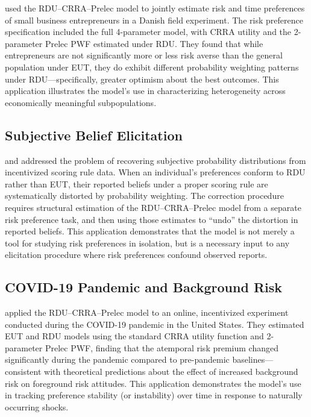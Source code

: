 \documentclass[12pt,a4paper]{article}
\begin{document}
\textcite{Andersen2014} used the RDU--CRRA--Prelec model to jointly estimate
risk and time preferences of small business entrepreneurs in a Danish field
experiment. The risk preference specification included the full 4-parameter
model, with CRRA utility and the 2-parameter Prelec PWF estimated under RDU.
They found that while entrepreneurs are not significantly more or less risk
averse than the general population under EUT, they do exhibit different
probability weighting patterns under RDU---specifically, greater optimism about
the best outcomes. This application illustrates the model's use in
characterizing heterogeneity across economically meaningful subpopulations.

\subsection{Subjective Belief Elicitation}

\textcite{Harrison2017} and \textcite{Harrison2022a} addressed the problem of
recovering subjective probability distributions from incentivized scoring rule
data. When an individual's preferences conform to RDU rather than EUT, their
reported beliefs under a proper scoring rule are systematically distorted by
probability weighting. The correction procedure requires structural estimation
of the RDU--CRRA--Prelec model from a separate risk preference task, and then
using those estimates to ``undo'' the distortion in reported beliefs. This
application demonstrates that the model is not merely a tool for studying risk
preferences in isolation, but is a necessary input to any elicitation procedure
where risk preferences confound observed reports.

\subsection{COVID-19 Pandemic and Background Risk}

\textcite{Harrison2022b} applied the RDU--CRRA--Prelec model to an online,
incentivized experiment conducted during the COVID-19 pandemic in the United
States. They estimated EUT and RDU models using the standard CRRA utility
function and 2-parameter Prelec PWF, finding that the atemporal risk premium
changed significantly during the pandemic compared to pre-pandemic
baselines---consistent with theoretical predictions about the effect of
increased background risk on foreground risk attitudes. This application
demonstrates the model's use in tracking preference stability (or instability)
over time in response to naturally occurring shocks.
\end{document}
